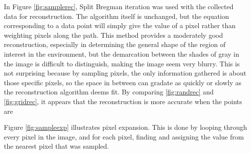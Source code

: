 \documentclass[english]{article}\usepackage[]{graphicx}\usepackage[]{color}
\begin{document}
In Figure \ref{fig:samplerec}, Split Bregman iteration was used with the collected data for reconstruction. The algorithm itself is unchanged, but the equation corresponding to a data point will simply give the value of a pixel rather than weighting pixels along the path. This method provides a moderately good reconstruction, especially in determining the general shape of the region of interest in the environment, but the demarcation between the shades of gray in the image is difficult to distinguish, making the image seem very blurry. This is not surprising because by sampling pixels, the only information gathered is about those specific pixels, so the space in between can gradate as quickly or slowly as the reconstruction algorithm deems fit. By comparing \ref{fig:randrec} and \ref{fig:gridrec}, it appears that the reconstruction is more accurate when the points are 

Figure \ref{fig:sampleexp} illustrates pixel expansion. This is done by looping through every pixel in the image, and for each pixel, finding and assigning the value from the nearest pixel that was sampled.
\end{document}
